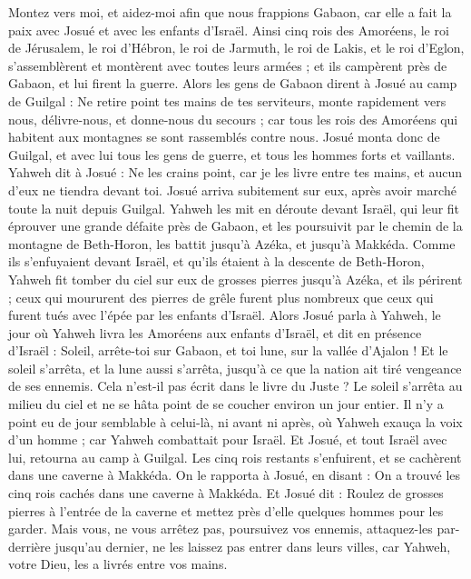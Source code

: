 \begin{multicols}{2}
Montez vers moi, et aidez-moi afin que nous frappions Gabaon, car elle a fait la paix avec Josué et avec les enfants d’Israël.
Ainsi cinq rois des Amoréens, le roi de Jérusalem, le roi d’Hébron, le roi de Jarmuth, le roi de Lakis, et le roi d’Eglon, s’assemblèrent et montèrent avec toutes leurs armées ; et ils campèrent près de Gabaon, et lui firent la guerre.
Alors les gens de Gabaon dirent à Josué au camp de Guilgal : Ne retire point tes mains de tes serviteurs, monte rapidement vers nous, délivre-nous, et donne-nous du secours ; car tous les rois des Amoréens qui habitent aux montagnes se sont rassemblés contre nous.
Josué monta donc de Guilgal, et avec lui tous les gens de guerre, et tous les hommes forts et vaillants.
Yahweh dit à Josué : Ne les crains point, car je les livre entre tes mains, et aucun d’eux ne tiendra devant toi.
Josué arriva subitement sur eux, après avoir marché toute la nuit depuis Guilgal.
Yahweh les mit en déroute devant Israël, qui leur fit éprouver une grande défaite près de Gabaon, et les poursuivit par le chemin de la montagne de Beth-Horon, les battit jusqu’à Azéka, et jusqu’à Makkéda.
Comme ils s’enfuyaient devant Israël, et qu’ils étaient à la descente de Beth-Horon, Yahweh fit tomber du ciel sur eux de grosses pierres jusqu’à Azéka, et ils périrent ; ceux qui moururent des pierres de grêle furent plus nombreux que ceux qui furent tués avec l’épée par les enfants d’Israël.
Alors Josué parla à Yahweh, le jour où Yahweh livra les Amoréens aux enfants d’Israël, et dit en présence d’Israël : Soleil, arrête-toi sur Gabaon, et toi lune, sur la vallée d’Ajalon !
Et le soleil s’arrêta, et la lune aussi s’arrêta, jusqu’à ce que la nation ait tiré vengeance de ses ennemis. Cela n’est-il pas écrit dans le livre du Juste ? Le soleil s’arrêta au milieu du ciel et ne se hâta point de se coucher environ un jour entier.
Il n’y a point eu de jour semblable à celui-là, ni avant ni après, où Yahweh exauça la voix d’un homme ; car Yahweh combattait pour Israël.
Et Josué, et tout Israël avec lui, retourna au camp à Guilgal.
Les cinq rois restants s’enfuirent, et se cachèrent dans une caverne à Makkéda.
On le rapporta à Josué, en disant : On a trouvé les cinq rois cachés dans une caverne à Makkéda.
Et Josué dit : Roulez de grosses pierres à l’entrée de la caverne et mettez près d’elle quelques hommes pour les garder.
Mais vous, ne vous arrêtez pas, poursuivez vos ennemis, attaquez-les par-derrière jusqu’au dernier, ne les laissez pas entrer dans leurs villes, car Yahweh, votre Dieu, les a livrés entre vos mains.

\end{multicols}
